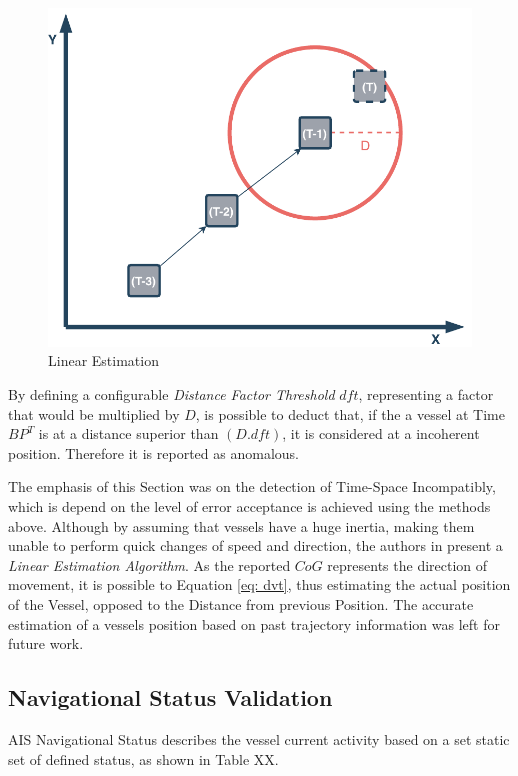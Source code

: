 \begin{figure}[H]
	\centering
	\includegraphics[scale = .6]{figures/Ch4/DVT.pdf}
    \caption{Linear Estimation}
    \label{fig: dvt}
\end{figure}

By defining a configurable \emph{Distance Factor Threshold} $dft$, representing a factor that would be multiplied by $D$, is possible to deduct that, if the a vessel at Time $BP^{T}$ is at a distance superior than $(D.dft)$, it is considered at a incoherent position. Therefore it is reported as anomalous.

The emphasis of this Section was on the detection of Time-Space Incompatibly, which is depend on the level of error acceptance is achieved using the methods above. 
Although by assuming that vessels have a huge inertia, making them unable to perform quick changes of speed and direction, the authors in \cite{Sadowski2015AlgorithmsCompression} present a \emph{Linear Estimation Algorithm}.
As the reported $CoG$ represents the direction of movement, it is possible to Equation \ref{eq: dvt}, thus estimating the actual position of the Vessel, opposed to the Distance from previous Position. The accurate estimation of a vessels position based on past trajectory information was left for future work. 


\subsection{Navigational Status Validation}
\label{subsection: 4 Navigational Status Validation}
AIS Navigational Status describes the vessel current activity based on a set static set of defined status, as shown in Table XX.

